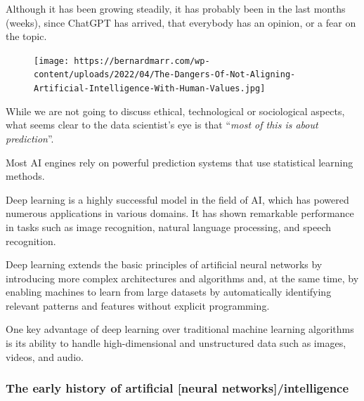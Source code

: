 \documentclass[
  letterpaper,
  DIV=11,
  numbers=noendperiod,
  oneside]{scrartcl}
\begin{document}
Although it has been growing steadily, it has probably been in the last
months (weeks), since ChatGPT has arrived, that everybody has an
opinion, or a fear on the topic.

\begin{figure}

{\centering \texttt{[image: https://bernardmarr.com/wp-content/uploads/2022/04/The-Dangers-Of-Not-Aligning-Artificial-Intelligence-With-Human-Values.jpg]}

}

\end{figure}

While we are not going to discuss ethical, technological or sociological
aspects, what seems clear to the data scientist's eye is that
``\emph{most of this is about prediction}''.

Most AI engines rely on powerful prediction systems that use statistical
learning methods.

Deep learning is a highly successful model in the field of AI, which has
powered numerous applications in various domains. It has shown
remarkable performance in tasks such as image recognition, natural
language processing, and speech recognition.

Deep learning extends the basic principles of artificial neural networks
by introducing more complex architectures and algorithms and, at the
same time, by enabling machines to learn from large datasets by
automatically identifying relevant patterns and features without
explicit programming.

One key advantage of deep learning over traditional machine learning
algorithms is its ability to handle high-dimensional and unstructured
data such as images, videos, and audio.

\hypertarget{the-early-history-of-artificial-neural-networksintelligence}{%
\subsubsection{The early history of artificial {[}neural
networks{]}/intelligence}\label{the-early-history-of-artificial-neural-networksintelligence}}
\end{document}

